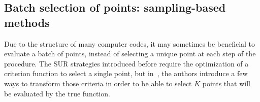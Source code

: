 \documentclass[../../Main_ManuscritThese.tex]{subfiles}
\begin{document}
\subsection{Batch selection of points: sampling-based methods}
\label{sec:sampling_based_criterion}

Due to the structure of many computer codes, it may sometimes be beneficial to evaluate a batch of points, instead of selecting a unique point at each step of the procedure. The SUR strategies introduced before require the optimization of a criterion function to select a single point, but in~\cite{ginsbourger_kriging_2010}, the authors introduce a few ways to transform those criteria in order to be able to select $K$ points that will be evaluated by the true function.

\end{document}
